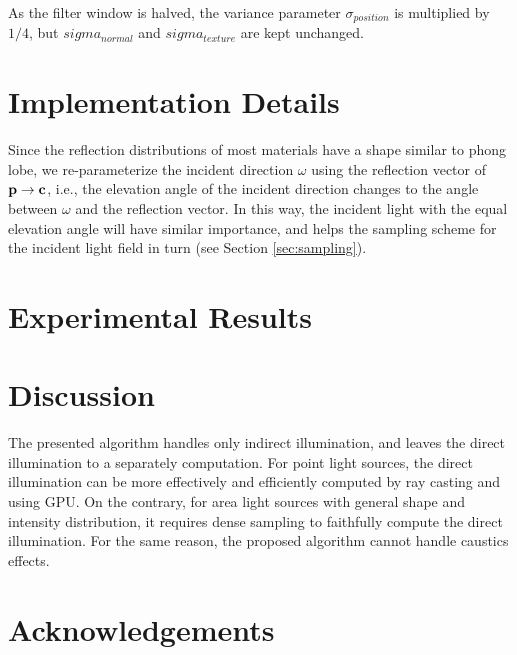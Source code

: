 \documentclass[review]{acmsiggraph}
\newcommand{\bfp}{{\bf p}}
\newcommand{\bfc}{{\bf c}}
\newcommand{\refSec}[1]{Section \ref{#1}}
\begin{document}
As the filter window is halved, the variance parameter $\sigma_{position}$ is multiplied by $1/4$, but $sigma_{normal}$ and $sigma_{texture}$ are kept unchanged.

\section{Implementation Details}

Since the reflection distributions of most materials have a shape similar to phong lobe, we re-parameterize the incident direction $\omega$ using the reflection vector of $\bfp\rightarrow\bfc$, i.e., the elevation angle of the incident direction changes to the angle between $\omega$ and the reflection vector. In this way, the incident light with the equal elevation angle will have similar importance, and helps the sampling scheme for the incident light field  in turn (see \refSec{sec:sampling}).
\section{Experimental Results}

\section{Discussion}

The presented algorithm handles only indirect illumination, and leaves the direct illumination to a separately computation. For point light sources, the direct illumination can be more effectively and efficiently computed by ray casting and using GPU. On the contrary, for area light sources with general shape and intensity distribution, it requires dense sampling to faithfully compute the direct illumination. For the same reason, the proposed algorithm cannot handle caustics effects.

\section*{Acknowledgements}


\nocite{*}

\end{document}

